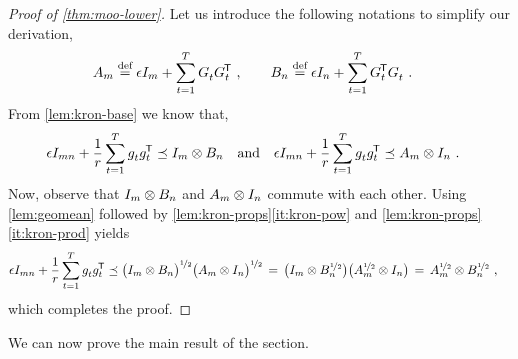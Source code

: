 \begin{proof}[Proof of \cref{thm:moo-lower}] 
Let us introduce the following notations to simplify our
derivation,
\begin{align*}
	A_m \stackrel{\text{def}}{=} \epsilon I_{m} + \sum_{t=1}^T G_t^{} G_t^{\mkern-1.5mu\scriptstyle\mathsf{T}} & ~ , \qquad
	B_n \stackrel{\text{def}}{=} \epsilon I_{n} + \sum_{t=1}^T G_t^{\mkern-1.5mu\scriptstyle\mathsf{T}} G_t^{} ~.
\end{align*}
From \cref{lem:kron-base} we know that,
\begin{align*}
\epsilon I_{mn} + \frac{1}{r} \sum_{t=1}^T g_t^{} g_t^{\mkern-1.5mu\scriptstyle\mathsf{T}}
	&\preceq I_{m} \otimes B_n ~~\mbox{ and }~~
\epsilon I_{mn} + \frac{1}{r} \sum_{t=1}^T g_t^{} g_t^{\mkern-1.5mu\scriptstyle\mathsf{T}}
	\preceq A_m \otimes I_{n} ~.
\end{align*}
Now, observe that $I_{m} \otimes B_n$ and $A_m \otimes I_{n}$ commute with each other.
Using \cref{lem:geomean} followed by \cref{lem:kron-props}\ref{it:kron-pow} and \cref{lem:kron-props}\ref{it:kron-prod} yields
\begin{align*}
\epsilon I_{mn} + \frac{1}{r} \sum_{t=1}^T g_t^{} g_t^{\mkern-1.5mu\scriptstyle\mathsf{T}}
&\preceq
	\mathopen{}\big( I_{m} \otimes B_n\big)^{{\smash{\nicefrac{1}{2}}}}
	\mathopen{}\big( A_m \otimes I_{n}\big)^{{\smash{\nicefrac{1}{2}}}}
\,=\,
	\mathopen{}\big( I_{m} \otimes B_n^{{\smash{\nicefrac{1}{2}}}}\big)
	\mathopen{}\big( A_m^{{\smash{\nicefrac{1}{2}}}} \otimes I_{n}\big)
\,=\,
A_m^{{\smash{\nicefrac{1}{2}}}} \otimes B_n^{{\smash{\nicefrac{1}{2}}}} ~ ,
\end{align*}
which completes the proof.
\end{proof}

We can now prove the main result of the section.

